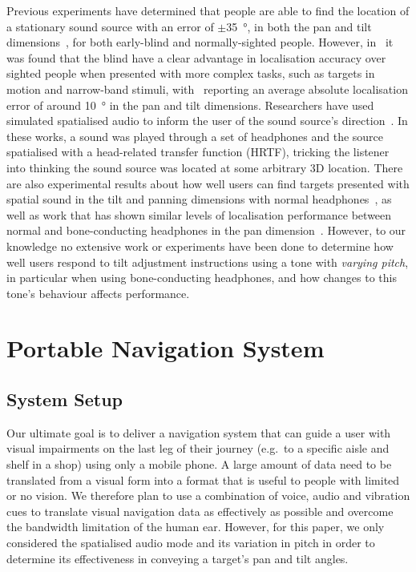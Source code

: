 \documentclass{llncs}
\begin{document}
Previous experiments have determined that people are able to find the location of a stationary sound source with an error of $\pm$\SI{35}{\degree}, in both the pan and tilt dimensions~\cite{zwiers2001spatial}, for both early-blind and normally-sighted people.
However, in~\cite{lewald2013exceptional,lessard1998early} it was found that the blind have a clear advantage in localisation accuracy over sighted people when presented with more complex tasks, such as targets in motion and narrow-band stimuli, with~\cite{lewald2013exceptional} reporting an average absolute localisation error of around \SI{10}{\degree} in the pan and tilt dimensions.
Researchers have used simulated spatialised audio to inform the user of the sound source's direction~\cite{holland2002audiogps,kammoun2012navigation,rebillat2009smart,menelas2010audio,wilson2007swan,zotkin2004rendering}.
In these works, a sound was played through a set of headphones and the source spatialised with a head-related transfer function (HRTF), tricking the listener into thinking the sound source was located at some arbitrary 3D location.
There are also experimental results about how well users can find targets presented with spatial sound in the tilt and panning dimensions with normal headphones~\cite{katz2011spatial,zwiers2001spatial}, as well as work that has shown similar levels of localisation performance between normal and bone-conducting headphones in the pan dimension~\cite{macdonald2006spatial}.
However, to our knowledge no extensive work or experiments have been done to determine how well users respond to tilt adjustment instructions using a tone with \textit{varying pitch}, in particular when using bone-conducting headphones, and how changes to this tone's behaviour affects performance. 

\section{Portable Navigation System}\label{sec:portable-navigation}

\subsection{System Setup}

Our ultimate goal is to deliver a navigation system that can guide a user with visual impairments on the last leg of their journey (e.g.\ to a specific aisle and shelf in a shop) using only a mobile phone.
A large amount of data need to be translated from a visual form into a format that is useful to people with limited or no vision.
We therefore plan to use a combination of voice, audio and vibration cues to translate visual navigation data as effectively as possible and overcome the bandwidth limitation of the human ear. 
However, for this paper, we only considered the spatialised audio mode and its variation in pitch in order to determine its effectiveness in conveying a target's pan and tilt angles.
\end{document}
